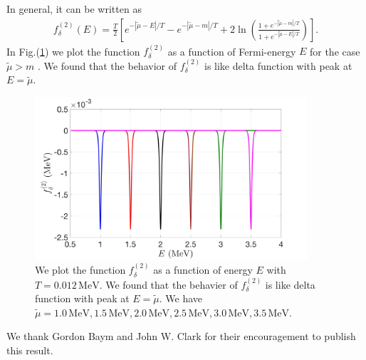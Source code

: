 \documentclass[sn-mathphys,Numbered]{sn-jnl}
\theoremstyle{thmstyleone}%
\theoremstyle{thmstyletwo}%
\theoremstyle{thmstylethree}%
\begin{document}
In general, it can be written as
\begin{align}
f^{(2)}_\delta(E)=\frac{T}{2}\left[e^{-|\tilde\mu-E|/T}-e^{-|\tilde\mu-m|/T}+2\ln{\left(\frac{1+e^{-|\tilde\mu-m|/T}}{1+e^{-|\tilde\mu-E|/T}}\right)}\right].
\end{align}
In Fig.(\ref{f_delta_checking}) we plot the function $f^{(2)}_\delta$ as a function of Fermi-energy $E$ for the case $\tilde\mu>m$ . We found that the behavior of $f^{(2)}_\delta$  is like delta function with peak at $E=\tilde\mu$. 
\begin{figure}[t]
\begin{center}
\includegraphics[width=0.9\textwidth]{./plot/f_delta_checking2}
\caption{We plot the function $f^{(2)}_\delta$ as a function of energy $E$ with $T=0.012\,\mathrm{MeV}$. We found that the behavier of $f^{(2)}_\delta$  is like delta function with peak at $E=\tilde\mu$. We have  $\tilde\mu=1.0\,\mathrm{MeV}, 1.5\,\mathrm{MeV}, 2.0\,\mathrm{MeV},2.5\,\mathrm{MeV}, 3.0\,\mathrm{MeV}, 3.5\,\mathrm{MeV}$.}
\label{f_delta_checking}
\end{center}
\end{figure}




We thank Gordon Baym and John W. Clark for their encouragement to publish this result.


\end{document}
